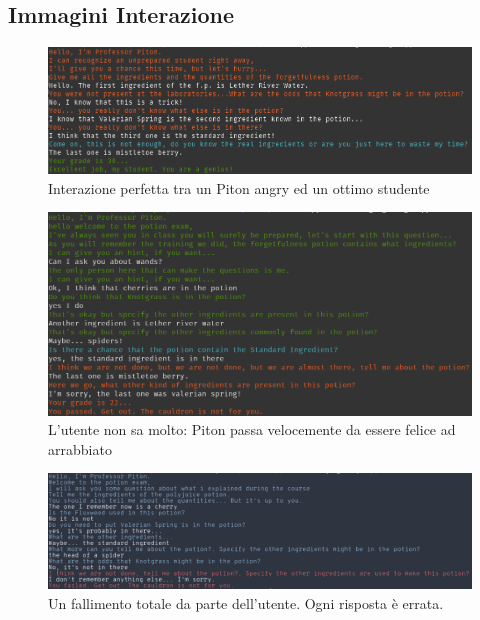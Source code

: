 \subsection{Immagini Interazione}
\begin{figure}[!hp]
    \centering
    \includegraphics[scale=0.37]{Images/from_angry_to_happy.png}
    \caption{Interazione perfetta tra un Piton angry ed un ottimo studente}
    \label{fig:from_angry_to_happy}
\end{figure}
\begin{figure}[!hp]
    \centering
    \includegraphics[scale=0.4]{Images/from_happy_to_angry.png}
    \caption{L'utente non sa molto: Piton passa velocemente da essere felice ad arrabbiato}
    \label{fig:from_happy_to_angry}
\end{figure}
\begin{figure}[!hp]
    \centering
    \includegraphics[scale=0.37]{Images/a_complete_fail.png}
    \caption{Un fallimento totale da parte dell'utente. Ogni risposta è errata.}
    \label{fig:a_complete_failure}
\end{figure}